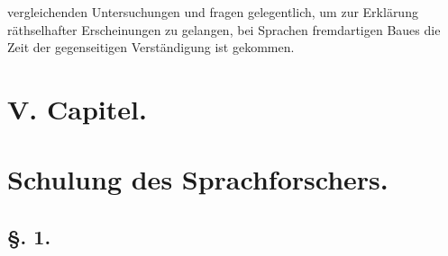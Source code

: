 vergleichenden Untersuchungen und fragen gelegentlich, um zur Erklärung räthselhafter Erscheinungen zu gelangen, bei Sprachen fremdartigen Baues  die Zeit der gegenseitigen Verständigung ist gekommen.

\begin{styleAnmerk}
\end{styleAnmerk}

\label{fp.31}

\clearpage{}
\section*{V. Capitel.}
\section*{Schulung des Sprachforschers.}
\subsection*{§. 1.}\label{I.V.1}

